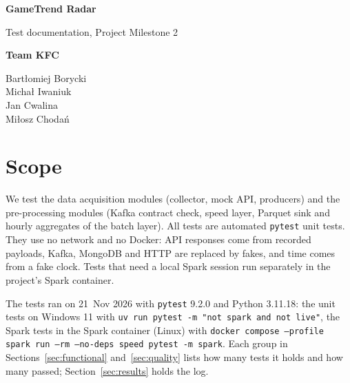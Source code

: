 \documentclass[10pt,a4paper]{article}
\newcommand{\ep}[1]{\texttt{\small #1}}
\begin{document}
\begin{titlepage}
\centering
\vspace*{\fill}
{\Huge\bfseries\color{kfcblue} GameTrend Radar\par}
\vspace{0.4cm}
{\Large Test documentation, Project Milestone 2\par}
\vspace{2.5cm}
{\Large\bfseries Team KFC\par}
\vspace{0.5cm}
{\large
Bart\l{}omiej Borycki\\[3pt]
Micha\l{} Iwaniuk\\[3pt]
Jan Cwalina\\[3pt]
Mi\l{}osz Choda\'n\par}
\vspace*{\fill}
\end{titlepage}

\section{Scope}\label{sec:scope}
We test the data acquisition modules (collector, mock API, producers) and the pre-processing modules (Kafka contract check, speed layer, Parquet sink and hourly aggregates of the batch layer). All tests are automated \ep{pytest} unit tests. They use no network and no Docker: API responses come from recorded payloads, Kafka, MongoDB and HTTP are replaced by fakes, and time comes from a fake clock. Tests that need a local Spark session run separately in the project's Spark container.

The tests ran on 21~Nov 2026 with \ep{pytest} 9.2.0 and Python 3.11.18: the unit tests on Windows 11 with \ep{uv run pytest -m "not spark and not live"}, the Spark tests in the Spark container (Linux) with \ep{docker compose --profile spark run --rm --no-deps speed pytest -m spark}. Each group in Sections~\ref{sec:functional} and~\ref{sec:quality} lists how many tests it holds and how many passed; Section~\ref{sec:results} holds the log.

\end{document}
